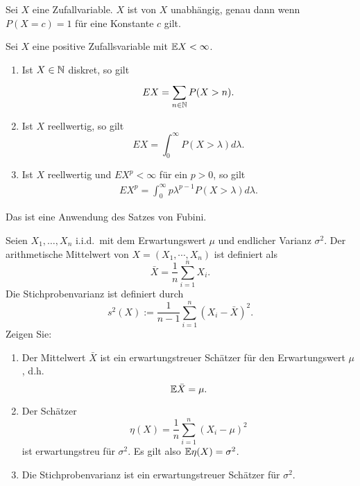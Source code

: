 Sei $X$ eine Zufallvariable. $X$ ist von $X$ unabhängig, genau dann wenn
$P(X = c)=1$ für eine Konstante $c$ gilt. %

 Sei $X$ eine
positive Zufallsvariable mit $\mathbb{E} X < \infty$. 
\begin{enumerate}
    \item Ist $X \in \mathbb N$ diskret, so gilt
        \begin{equation}
            E X = \sum_{n\in\mathbb N}^{} P(X>n).
        \end{equation}
    \item Ist $X$ reellwertig, so gilt
        \begin{equation}
            E X = \int_{0}^{\infty} P(X>\lambda) d\lambda.
        \end{equation}
    \item Ist $X$ reellwertig und $E X^p<\infty$ für ein $p>0$, so gilt
        \begin{eqnarray}
            E X^p = \int_{0}^{\infty} p\lambda^{p-1} P(X>\lambda) d\lambda.
        \end{eqnarray}
\end{enumerate} 

\solution Das ist eine Anwendung des Satzes von Fubini.

Seien $X_1,\ldots,X_n$ i.i.d.\ mit dem Erwartungswert $\mu$ und endlicher
Varianz $\sigma^2$. Der arithmetische Mittelwert von $X=(X_1,\cdots,X_n)$ ist
definiert als
\begin{equation*}
    \bar X = \frac{1}{n} \sum_{i=1}^{n} X_i. 
\end{equation*}
Die Stichprobenvarianz ist definiert durch
\begin{equation*}
    s^2(X) := \frac{1}{n-1} \sum_{i=1}^{n} (X_i - \bar X)^2.
\end{equation*}
Zeigen Sie: 
\begin{enumerate}
    \item Der Mittelwert $\bar X$ ist ein erwartungstreuer Schätzer für den
        Erwartungswert $\mu$, d.h.\ 
        \begin{equation*}
            \mathbb{E} \bar X = \mu. 
        \end{equation*}
    \item Der Schätzer
        \begin{equation*}
            \eta(X) = \frac{1}{n} \sum_{i=1}^{n} \left( X_i - \mu \right)^2
        \end{equation*}
        ist erwartungstreu für $\sigma^2$. Es gilt also $\mathbb{E} \eta(X) = \sigma^2$.  
    \item Die Stichprobenvarianz ist ein erwartungstreuer Schätzer für $\sigma^2$. 
\end{enumerate}

